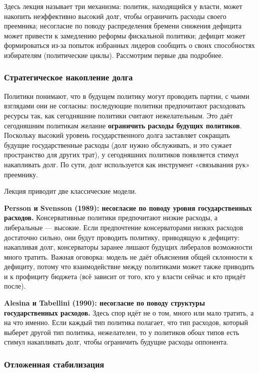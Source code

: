 \documentclass[11pt,a4paper]{article}
\begin{document}
Здесь лекция называет три механизма: политик, находящийся у власти, может накопить неэффективно высокий долг, чтобы ограничить расходы своего преемника; несогласие по поводу распределения бремени снижения дефицита может привести к замедлению реформы фискальной политики; дефицит может формироваться из-за попыток избранных лидеров сообщить о своих способностях избирателям (политические циклы). Рассмотрим первые два подробнее.

\subsubsection{Стратегическое накопление долга}

Политики понимают, что в будущем политику могут проводить партии, с чьими взглядами они не согласны: последующие политики предпочитают расходовать ресурсы так, как сегодняшние политики считают нежелательным. Это даёт сегодняшним политикам желание \textbf{ограничить расходы будущих политиков}. Поскольку высокий уровень государственного долга заставляет сокращать будущие государственные расходы (долг нужно обслуживать, и это сужает пространство для других трат), у сегодняшних политиков появляется стимул накапливать долг. По сути, долг используется как инструмент «связывания рук» преемнику.

Лекция приводит две классические модели.

\textbf{Persson и Svensson (1989): несогласие по поводу уровня государственных расходов.} Консервативные политики предпочитают низкие расходы, а либеральные --- высокие. Если предпочтение консерваторами низких расходов достаточно сильно, они будут проводить политику, приводящую к дефициту: накапливая долг, консерваторы заранее лишают будущих либералов возможности много тратить. Важная оговорка: модель не даёт объяснения общей склонности к дефициту, потому что взаимодействие между политиками может также приводить и к профициту бюджета (всё зависит от того, кто у власти сейчас и кто придёт после).

\textbf{Alesina и Tabellini (1990): несогласие по поводу структуры государственных расходов.} Здесь спор идёт не о том, много или мало тратить, а на что именно. Если каждый тип политика полагает, что тип расходов, который выберет другой тип политика, нежелателен, то у политиков \emph{обоих} типов есть стимул накапливать долг, чтобы ограничить будущие расходы оппонента.

\subsubsection{Отложенная стабилизация}
\end{document}
